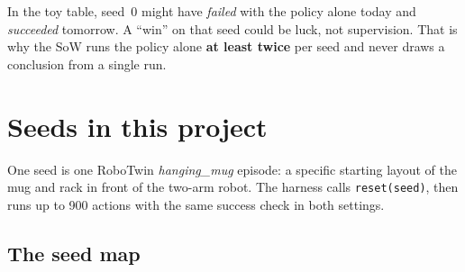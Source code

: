 \documentclass[11pt,a4paper]{article}
\newcommand{\tool}[1]{\texttt{\small #1}}
\begin{document}
\begin{center}
\end{center}

\begin{careful}
In the toy table, seed~0 might have \emph{failed} with the policy alone today and \emph{succeeded} tomorrow. A ``win''
on that seed could be luck, not supervision. That is why the SoW runs the policy alone \textbf{at least twice} per seed
and never draws a conclusion from a single run.
\end{careful}

\section{Seeds in this project}\label{sec:project}

One seed is one RoboTwin \emph{hanging\_mug} episode: a specific starting layout of the mug and rack in front of the
two-arm robot. The harness calls \tool{reset(seed)}, then runs up to 900 actions with the same success check in both
settings.

\subsection{The seed map}
\end{document}
